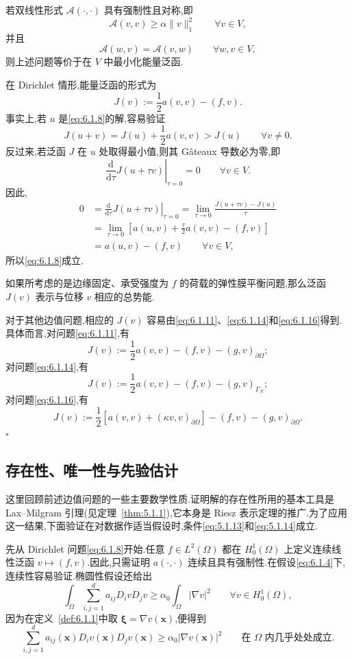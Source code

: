 \begin{note}
若双线性形式 \(\mathcal A(\cdot,\cdot)\) 具有强制性且对称,即
\[
  \mathcal A(v,v)\ge\alpha\|v\|_1^2\qquad\forall v\in V,
\]
并且
\[
  \mathcal A(w,v)=\mathcal A(v,w)\qquad\forall w,v\in V,
\]
则上述问题等价于在 \(V\) 中最小化{\heiti 能量泛函}.

在 Dirichlet 情形,能量泛函的形式为
\[
  J(v):=\frac12a(v,v)-(f,v).
\]
事实上,若 \(u\) 是\eqref{eq:6.1.8}的解,容易验证
\[
  J(u+v)=J(u)+\frac12a(v,v)>J(u)\qquad\forall v\ne0.
\]
反过来,若泛函 \(J\) 在 \(u\) 处取得最小值,则其 Gâteaux 导数必为零,即
\[
  \left.\frac{\mathrm d}{\mathrm d\tau}J(u+\tau v)\right|_{\tau=0}=0
  \qquad\forall v\in V.
\]
因此,
\[
  \begin{aligned}
    0&=\left.\frac{\mathrm d}{\mathrm d\tau}J(u+\tau v)\right|_{\tau=0}
      =\lim_{\tau\to0}\frac{J(u+\tau v)-J(u)}{\tau}\\
     &=\lim_{\tau\to0}\left[a(u,v)+\frac{\tau}2a(v,v)-(f,v)\right]\\
     &=a(u,v)-(f,v)\qquad\forall v\in V,
  \end{aligned}
\]
所以\eqref{eq:6.1.8}成立.

如果所考虑的是边缘固定、承受强度为 \(f\) 的荷载的弹性膜平衡问题,那么泛函 \(J(v)\) 表示与位移 \(v\) 相应的总势能.

对于其他边值问题,相应的 \(J(v)\) 容易由\eqref{eq:6.1.11}、\eqref{eq:6.1.14}和\eqref{eq:6.1.16}得到.具体而言,对问题\eqref{eq:6.1.11},有
\[
  J(v):=\frac12a(v,v)-(f,v)-(g,v)_{\partial\Omega};
\]
对问题\eqref{eq:6.1.14},有
\[
  J(v):=\frac12a(v,v)-(f,v)-(g,v)_{\Gamma_N};
\]
对问题\eqref{eq:6.1.16},有
\[
  J(v):=\frac12[a(v,v)+(\kappa v,v)_{\partial\Omega}]
         -(f,v)-(g,v)_{\partial\Omega}.
\]
\hfill\(\square\)
\end{note}

\subsection{存在性、唯一性与先验估计}\label{sec:6.1.2}

这里回顾前述边值问题的一些主要数学性质.证明解的存在性所用的基本工具是 Lax--Milgram 引理(见定理~\ref{thm:5.1.1}),它本身是 Riesz 表示定理的推广.为了应用这一结果,下面验证在对数据作适当假设时,条件\eqref{eq:5.1.13}和\eqref{eq:5.1.14}成立.

先从 Dirichlet 问题\eqref{eq:6.1.8}开始.任意 \(f\in L^2(\Omega)\) 都在 \(H_0^1(\Omega)\) 上定义连续线性泛函 \(v\mapsto(f,v)\).因此,只需证明 \(a(\cdot,\cdot)\) 连续且具有强制性.在假设\eqref{eq:6.1.4}下,连续性容易验证.椭圆性假设还给出
\begin{equation}\label{eq:6.1.17}
  \int_\Omega\sum_{i,j=1}^d a_{ij}D_ivD_jv
    \ge\alpha_0\int_\Omega|\nabla v|^2\qquad\forall v\in H_0^1(\Omega),
\end{equation}
因为在定义~\ref{def:6.1.1}中取 \(\boldsymbol{\xi}=\nabla v(\boldsymbol{x})\),便得到
\[
  \sum_{i,j=1}^d a_{ij}(\boldsymbol{x})D_iv(\boldsymbol{x})D_jv(\boldsymbol{x})
    \ge\alpha_0|\nabla v(\boldsymbol{x})|^2
    \qquad\text{在 \(\Omega\) 内几乎处处成立.}
\]

